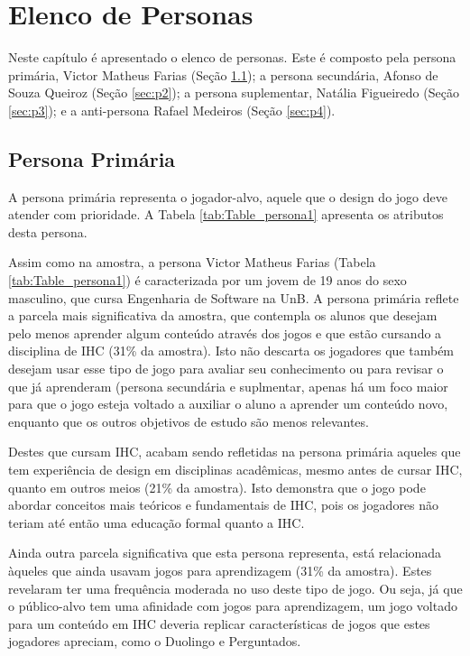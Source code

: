 \chapter{Elenco de Personas}
\label{chap:ele-pers}

Neste capítulo é apresentado o elenco de personas. Este é composto pela persona primária, Victor Matheus Farias (Seção \ref{sec:p1}); a persona secundária, Afonso de Souza Queiroz (Seção \ref{sec:p2}); a persona suplementar, Natália Figueiredo (Seção \ref{sec:p3}); e a anti-persona Rafael Medeiros (Seção \ref{sec:p4}).


\section{Persona Primária}
\label{sec:p1}

A persona primária representa o jogador-alvo, aquele que o design do jogo deve atender com prioridade. A Tabela \ref{tab:Table_persona1} apresenta os atributos desta persona.



Assim como na amostra, a persona Victor Matheus Farias (Tabela \ref{tab:Table_persona1}) é caracterizada por um jovem de 19 anos do sexo masculino, que cursa Engenharia de Software na UnB. A persona primária reflete a parcela mais significativa da amostra, que contempla os alunos que desejam pelo menos aprender algum conteúdo através dos jogos e que estão cursando a disciplina de IHC (31\% da amostra). Isto não descarta os jogadores que também desejam usar esse tipo de jogo para avaliar seu conhecimento ou para revisar o que já aprenderam (persona secundária e suplmentar, apenas há um foco maior para que o jogo esteja voltado a auxiliar o aluno a aprender um conteúdo novo, enquanto que os outros objetivos de estudo são menos relevantes. 

Destes que cursam IHC, acabam sendo refletidas na persona primária aqueles que tem experiência de design em disciplinas acadêmicas, mesmo antes de cursar IHC, quanto em outros meios (21\% da amostra). Isto demonstra que o jogo pode abordar conceitos mais teóricos e fundamentais de IHC, pois os jogadores não teriam até então uma educação formal quanto a IHC.

Ainda outra parcela significativa que esta persona representa, está relacionada àqueles que ainda usavam jogos para aprendizagem (31\% da amostra). Estes revelaram ter uma frequência moderada no uso deste tipo de jogo. Ou seja, já que o público-alvo tem uma afinidade com jogos para aprendizagem, um jogo voltado para um conteúdo em IHC deveria replicar características de jogos que estes jogadores apreciam, como o Duolingo e Perguntados.

